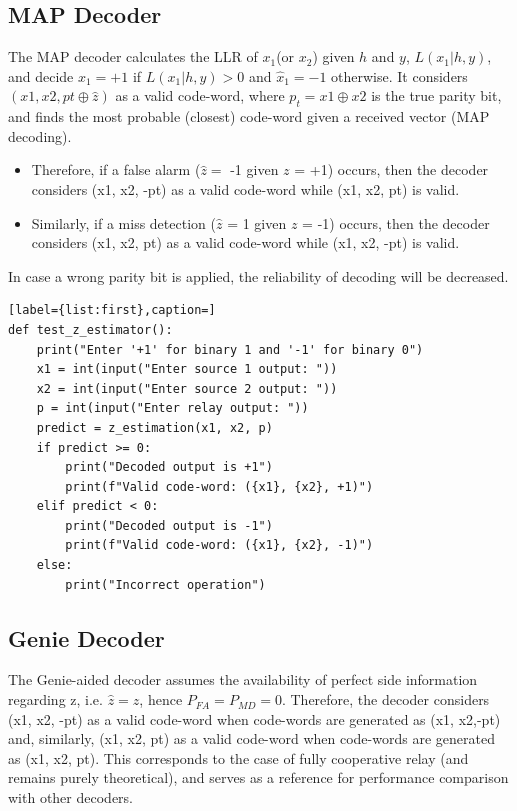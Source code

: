 \documentclass[conference]{IEEEtran}
\begin{document}
\subsection{MAP Decoder}
The MAP decoder calculates the LLR of $x_1$(or $x_2$) given $h$ and $y$, $L(x_1|h,y)$, and decide $\hat x_1= +1$ if $L(x_1|h,y)>0$ and $\hat x_1= -1$ otherwise. \newline
It considers $(x1, x2, pt \oplus \hat{z})$ as a valid code-word, where $p_t = x1\oplus x2$ is the true parity bit, and finds the most probable (closest) code-word given a received vector (MAP decoding). 
\begin{itemize}
\item Therefore, if a false alarm ($\hat{z}=$ -1 given $z$ = +1) occurs, then the decoder considers (x1, x2, -pt)  as a valid code-word while (x1, x2, pt) is valid. 
\item Similarly, if a miss detection ($\hat{z}$ = 1 given $z$ = -1) occurs, then the decoder considers (x1, x2, pt) as a valid code-word while (x1, x2, -pt) is valid. 
\end{itemize}
In case a wrong parity bit is applied, the reliability of decoding will be decreased.
\begin{lstlisting}[label={list:first},caption=]
def test_z_estimator():
    print("Enter '+1' for binary 1 and '-1' for binary 0")
    x1 = int(input("Enter source 1 output: "))
    x2 = int(input("Enter source 2 output: "))
    p = int(input("Enter relay output: "))
    predict = z_estimation(x1, x2, p)
    if predict >= 0:
        print("Decoded output is +1")
        print(f"Valid code-word: ({x1}, {x2}, +1)")
    elif predict < 0:
        print("Decoded output is -1")
        print(f"Valid code-word: ({x1}, {x2}, -1)")
    else:
        print("Incorrect operation")
\end{lstlisting}
\subsection{Genie Decoder}
The Genie-aided decoder assumes the availability of perfect side information regarding z, i.e. $\hat{z} = z$, hence $P_{FA}=P_{MD}=0$. Therefore, the decoder considers (x1, x2, -pt) as a valid code-word when code-words are generated as (x1, x2,-pt) and, similarly, (x1, x2, pt) as a valid code-word when code-words are generated as (x1, x2, pt). This corresponds to the case of fully cooperative relay (and remains purely theoretical), and serves as a reference for performance comparison with other decoders.
\end{document}
